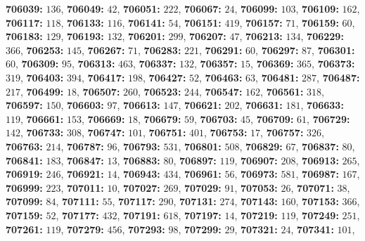 \textsf{\bfseries 706039:} $136$, \textsf{\bfseries 706049:} $42$, \textsf{\bfseries 706051:} $222$, \textsf{\bfseries 706067:} $24$, \textsf{\bfseries 706099:} $103$, \textsf{\bfseries 706109:} $162$, \textsf{\bfseries 706117:} $118$, \textsf{\bfseries 706133:} $116$, \textsf{\bfseries 706141:} $54$, \textsf{\bfseries 706151:} $419$, \textsf{\bfseries 706157:} $71$, \textsf{\bfseries 706159:} $60$, \textsf{\bfseries 706183:} $129$, \textsf{\bfseries 706193:} $132$, \textsf{\bfseries 706201:} $299$, \textsf{\bfseries 706207:} $47$, \textsf{\bfseries 706213:} $134$, \textsf{\bfseries 706229:} $366$, \textsf{\bfseries 706253:} $145$, \textsf{\bfseries 706267:} $71$, \textsf{\bfseries 706283:} $221$, \textsf{\bfseries 706291:} $60$, \textsf{\bfseries 706297:} $87$, \textsf{\bfseries 706301:} $60$, \textsf{\bfseries 706309:} $95$, \textsf{\bfseries 706313:} $463$, \textsf{\bfseries 706337:} $132$, \textsf{\bfseries 706357:} $15$, \textsf{\bfseries 706369:} $365$, \textsf{\bfseries 706373:} $319$, \textsf{\bfseries 706403:} $394$, \textsf{\bfseries 706417:} $198$, \textsf{\bfseries 706427:} $52$, \textsf{\bfseries 706463:} $63$, \textsf{\bfseries 706481:} $287$, \textsf{\bfseries 706487:} $217$, \textsf{\bfseries 706499:} $18$, \textsf{\bfseries 706507:} $260$, \textsf{\bfseries 706523:} $244$, \textsf{\bfseries 706547:} $162$, \textsf{\bfseries 706561:} $318$, \textsf{\bfseries 706597:} $150$, \textsf{\bfseries 706603:} $97$, \textsf{\bfseries 706613:} $147$, \textsf{\bfseries 706621:} $202$, \textsf{\bfseries 706631:} $181$, \textsf{\bfseries 706633:} $119$, \textsf{\bfseries 706661:} $153$, \textsf{\bfseries 706669:} $18$, \textsf{\bfseries 706679:} $59$, \textsf{\bfseries 706703:} $45$, \textsf{\bfseries 706709:} $61$, \textsf{\bfseries 706729:} $142$, \textsf{\bfseries 706733:} $308$, \textsf{\bfseries 706747:} $101$, \textsf{\bfseries 706751:} $401$, \textsf{\bfseries 706753:} $17$, \textsf{\bfseries 706757:} $326$, \textsf{\bfseries 706763:} $214$, \textsf{\bfseries 706787:} $96$, \textsf{\bfseries 706793:} $531$, \textsf{\bfseries 706801:} $508$, \textsf{\bfseries 706829:} $67$, \textsf{\bfseries 706837:} $80$, \textsf{\bfseries 706841:} $183$, \textsf{\bfseries 706847:} $13$, \textsf{\bfseries 706883:} $80$, \textsf{\bfseries 706897:} $119$, \textsf{\bfseries 706907:} $208$, \textsf{\bfseries 706913:} $265$, \textsf{\bfseries 706919:} $246$, \textsf{\bfseries 706921:} $14$, \textsf{\bfseries 706943:} $434$, \textsf{\bfseries 706961:} $56$, \textsf{\bfseries 706973:} $581$, \textsf{\bfseries 706987:} $167$, \textsf{\bfseries 706999:} $223$, \textsf{\bfseries 707011:} $10$, \textsf{\bfseries 707027:} $269$, \textsf{\bfseries 707029:} $91$, \textsf{\bfseries 707053:} $26$, \textsf{\bfseries 707071:} $38$, \textsf{\bfseries 707099:} $84$, \textsf{\bfseries 707111:} $55$, \textsf{\bfseries 707117:} $290$, \textsf{\bfseries 707131:} $274$, \textsf{\bfseries 707143:} $160$, \textsf{\bfseries 707153:} $366$, \textsf{\bfseries 707159:} $52$, \textsf{\bfseries 707177:} $432$, \textsf{\bfseries 707191:} $618$, \textsf{\bfseries 707197:} $14$, \textsf{\bfseries 707219:} $119$, \textsf{\bfseries 707249:} $251$, \textsf{\bfseries 707261:} $119$, \textsf{\bfseries 707279:} $456$, \textsf{\bfseries 707293:} $98$, \textsf{\bfseries 707299:} $29$, \textsf{\bfseries 707321:} $24$, \textsf{\bfseries 707341:} $101$, 
